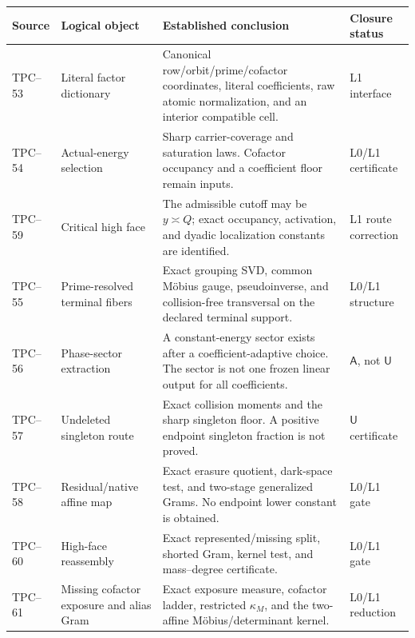 \begin{center}
\small
\begin{tabular}{>{\raggedright\arraybackslash}p{}
                >{\raggedright\arraybackslash}p{}
                >{\raggedright\arraybackslash}p{}
                >{\raggedright\arraybackslash}p{}}
\toprule
Source & Logical object & Established conclusion & Closure status\\
\midrule
TPC--53
& Literal factor dictionary
& Canonical row/orbit/prime/cofactor coordinates, literal coefficients,
  raw atomic normalization, and an interior compatible cell.
& L1 interface\\
\addlinespace
TPC--54
& Actual-energy selection
& Sharp carrier-coverage and saturation laws.  Cofactor occupancy and a
  coefficient floor remain inputs.
& L0/L1 certificate\\
\addlinespace
TPC--59
& Critical high face
& The admissible cutoff may be \(y\asymp Q\); exact occupancy,
  activation, and dyadic localization constants are identified.
& L1 route correction\\
\addlinespace
TPC--55
& Prime-resolved terminal fibers
& Exact grouping SVD, common M\"obius gauge, pseudoinverse, and
  collision-free transversal on the declared terminal support.
& L0/L1 structure\\
\addlinespace
TPC--56
& Phase-sector extraction
& A constant-energy sector exists after a coefficient-adaptive choice.
  The sector is not one frozen linear output for all coefficients.
& \(\mathsf A\), not \(\mathsf U\)\\
\addlinespace
TPC--57
& Undeleted singleton route
& Exact collision moments and the sharp singleton floor.  A positive
  endpoint singleton fraction is not proved.
& \(\mathsf U\) certificate\\
\addlinespace
TPC--58
& Residual/native affine map
& Exact erasure quotient, dark-space test, and two-stage generalized
  Grams.  No endpoint lower constant is obtained.
& L0/L1 gate\\
\addlinespace
TPC--60
& High-face reassembly
& Exact represented/missing split, shorted Gram, kernel test, and
  mass--degree certificate.
& L0/L1 gate\\
\addlinespace
TPC--61
& Missing cofactor exposure and alias Gram
& Exact exposure measure, cofactor ladder, restricted \(\kappa_M\), and
  the two-affine M\"obius/determinant kernel.
& L0/L1 reduction\\
\bottomrule
\end{tabular}
\end{center}

